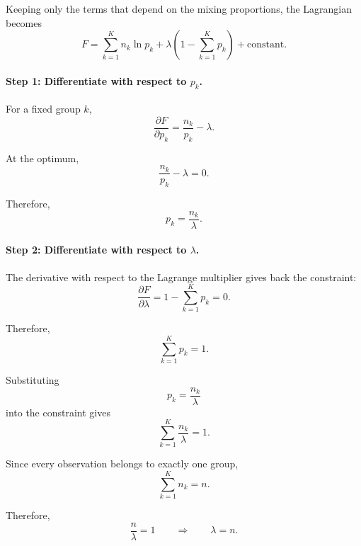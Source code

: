 Keeping only the terms that depend on the mixing proportions,
the Lagrangian becomes
\begin{equation*}
F
=
\sum_{k=1}^K n_k\ln p_k
+
\lambda
\left(
1-\sum_{k=1}^Kp_k
\right)
+
\text{constant}.
\end{equation*}

\paragraph{Step 1: Differentiate with respect to $p_k$.}

For a fixed group $k$,
\begin{equation*}
\frac{\partial F}{\partial p_k}
=
\frac{n_k}{p_k}-\lambda.
\end{equation*}

At the optimum,
\begin{equation*}
\frac{n_k}{p_k}-\lambda=0.
\end{equation*}

Therefore,
\begin{equation*}
p_k=\frac{n_k}{\lambda}.
\end{equation*}

\paragraph{Step 2: Differentiate with respect to $\lambda$.}

The derivative with respect to the Lagrange multiplier gives back
the constraint:
\begin{equation*}
\frac{\partial F}{\partial\lambda}
=
1-\sum_{k=1}^Kp_k
=
0.
\end{equation*}

Therefore,
\begin{equation*}
\sum_{k=1}^Kp_k=1.
\end{equation*}

Substituting
\begin{equation*}
p_k=\frac{n_k}{\lambda}
\end{equation*}
into the constraint gives
\begin{equation*}
\sum_{k=1}^K\frac{n_k}{\lambda}=1.
\end{equation*}

Since every observation belongs to exactly one group,
\begin{equation*}
\sum_{k=1}^Kn_k=n.
\end{equation*}

Therefore,
\begin{equation*}
\frac{n}{\lambda}=1
\qquad\Longrightarrow\qquad
\lambda=n.
\end{equation*}

